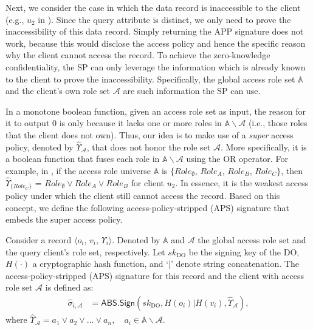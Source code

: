Next, we consider the case in which the data record is inaccessible to the client (e.g.,  $u_2$ in ). Since the query attribute is distinct, we only need to prove the inaccessibility of this data record. Simply returning the APP signature does not work, because this would disclose the access policy and hence the specific reason why the client cannot access the record. To achieve the zero-knowledge confidentiality, the SP can only leverage the information which is already known to the client to prove the inaccessibility. Specifically, the global access role set $\mathbb{A}$ and the client's own role set $\mathcal{A}$ are such information the SP can use.

In a monotone boolean function, given an access role set as input, the reason for it to output 0 is only because it lacks one or more roles in $\mathbb{A}\backslash\mathcal{A}$ (i.e., those roles that the client does not own). Thus, our idea is to make use of a \emph{super} access policy, denoted by $\hat{\Upsilon}_{\mathcal{A}}$, that does not honor the role set $\mathcal{A}$. More specifically, it is a boolean function that fuses each  role in  $\mathbb{A}\backslash\mathcal{A}$ using the OR operator. For example, in , if the access role universe $\mathbb{A}$ is $\{{Role}_{\emptyset}$, ${Role}_A$, ${Role}_B$, ${Role}_C\}$,
then
$\hat{\Upsilon}_{\{{Role}_C \}}$ = ${Role}_{\emptyset} \lor {Role}_A \lor {Role}_B$ for client $u_2$. In essence, it is the weakest access policy under which the client still cannot access the record. Based on this concept, we define the following access-policy-stripped (APS) signature that embeds the super access policy.

\begin{definition}
  Consider a record $\langle o_i$, $v_i$, $\Upsilon_i\rangle$. Denoted by $\mathbb{A}$ and $\mathcal{A}$ the global access role set and the query client's role set, respectively. Let ${sk}_{\textrm{DO}}$ be the signing key of the DO, $H(\cdot)$ a cryptographic hash function, and `$|$' denote string concatenation. The access-policy-stripped (APS) signature for this record and the client with access role set $\mathcal{A}$ is defined as:
  \begin{align*}
    \hat{\sigma}_{i, \mathcal{A}} & = \textsf{ABS.Sign}({sk}_{\textrm{DO}}, H(o_i) | H(v_i) , \hat{\Upsilon}_{\mathcal{A}}),
  \end{align*}
  where $\hat{\Upsilon}_{\mathcal{A}} = a_1 \lor a_2 \lor \dots \lor a_n, \quad a_i \in \mathbb{A}\backslash\mathcal{A}$.
\end{definition}

